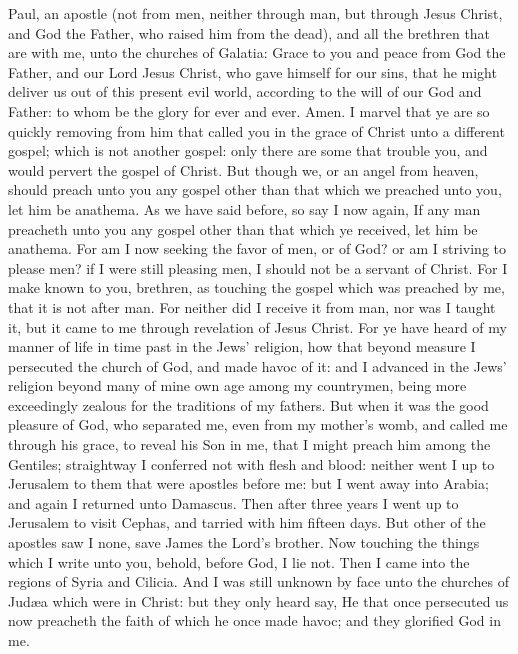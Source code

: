 


Paul, an apostle (not from men, neither through man, but through Jesus Christ, and God the Father, who raised him from the dead), and all the brethren that are with me, unto the churches of Galatia: Grace to you and peace from God the Father, and our Lord Jesus Christ, who gave himself for our sins, that he might deliver us out of this present evil world, according to the will of our God and Father: to whom be the glory for ever and ever. Amen.  I marvel that ye are so quickly removing from him that called you in the grace of Christ unto a different gospel; which is not another gospel: only there are some that trouble you, and would pervert the gospel of Christ. But though we, or an angel from heaven, should preach unto you any gospel other than that which we preached unto you, let him be anathema. As we have said before, so say I now again, If any man preacheth unto you any gospel other than that which ye received, let him be anathema. For am I now seeking the favor of men, or of God? or am I striving to please men? if I were still pleasing men, I should not be a servant of Christ.  For I make known to you, brethren, as touching the gospel which was preached by me, that it is not after man. For neither did I receive it from man, nor was I taught it, but it came to me through revelation of Jesus Christ. For ye have heard of my manner of life in time past in the Jews’ religion, how that beyond measure I persecuted the church of God, and made havoc of it: and I advanced in the Jews’ religion beyond many of mine own age among my countrymen, being more exceedingly zealous for the traditions of my fathers. But when it was the good pleasure of God, who separated me, even from my mother’s womb, and called me through his grace, to reveal his Son in me, that I might preach him among the Gentiles; straightway I conferred not with flesh and blood: neither went I up to Jerusalem to them that were apostles before me: but I went away into Arabia; and again I returned unto Damascus.  Then after three years I went up to Jerusalem to visit Cephas, and tarried with him fifteen days. But other of the apostles saw I none, save James the Lord’s brother. Now touching the things which I write unto you, behold, before God, I lie not. Then I came into the regions of Syria and Cilicia. And I was still unknown by face unto the churches of Judæa which were in Christ: but they only heard say, He that once persecuted us now preacheth the faith of which he once made havoc; and they glorified God in me. 

